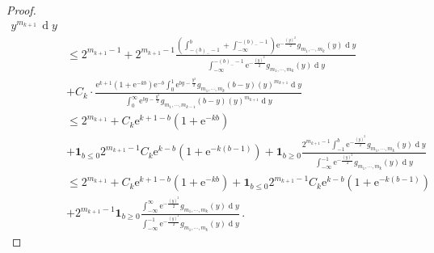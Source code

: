 \documentclass[11pt, reqno]{amsart}
\numberwithin{equation}{section}
\newcommand{\diff}{\ensuremath{\operatorname{d}\!}}
\begin{document}
\begin{proof}
\begin{align*}
{    y^{m_{k+1}} \, \diff y
}\\
&\displaystyle\le 2^{m_{k+1}-1} + 2^{m_{k+1}-1}\frac{\left(\int^b_{-(b)_- -1}+\int^{-(b)_- -1}_{-\infty}\right)\mathrm{e}^{-\frac{(y)^2}{2}} g_{m_1, \cdots, m_{k}}(y)\diff y}{\int^{-(b)_- -1}_{-\infty}\mathrm{e}^{-\frac{(y)^2}{2}} g_{m_1, \cdots, m_{k}}(y)\diff y}\\
         &\displaystyle +C_k\cdot\frac{\mathrm{e}^{k+1}(1+\mathrm{e}^{-kb}) \mathrm{e}^{-b}\int^1_{0}\mathrm{e}^{by-\frac{y^2}{2}}g_{m_1, \cdots, m_{k}}(b-y)(y)^{m_{k+1}}\diff y}{\int^\infty_{0}\mathrm{e}^{by-\frac{y^2}{2}} g_{m_1, \cdots, m_{k-1}}(b-y)(y)^{m_{k+1}}\diff y}\\
         &\displaystyle\le 2^{m_{k+1}} +C_k\mathrm{e}^{k+1-b} (1+\mathrm{e}^{-kb})\\
         &\displaystyle+\mathbf{1}_{b\le 0}2^{m_{k+1}-1}C_k\mathrm{e}^{k-b} (1+\mathrm{e}^{-k(b-1)})+\mathbf{1}_{b\ge0}\frac{2^{m_{k+1}-1}\int^b_{ -1}\mathrm{e}^{-\frac{(y)^2}{2}} g_{m_1, \cdots, m_{k}}(y)\diff y}{\int^{-1}_{-\infty}\mathrm{e}^{-\frac{(y)^2}{2}} g_{m_1, \cdots, m_{k}}(y)\diff y}\\
         &\displaystyle\le 2^{m_{k+1}} + C_k\mathrm{e}^{k+1-b} (1+\mathrm{e}^{-kb})+ \mathbf{1}_{b\le 0}2^{m_{k+1}-1}C_k\mathrm{e}^{k-b} (1+\mathrm{e}^{-k(b-1)})\\
         &+ 2^{m_{k+1}-1}\mathbf{1}_{b\ge0}\frac{\int^\infty_{ -\infty}\mathrm{e}^{-\frac{(y)^2}{2}} g_{m_1, \cdots, m_{k}}(y)\diff y}{\int^{-1}_{-\infty}\mathrm{e}^{-\frac{(y)^2}{2}} g_{m_1, \cdots, m_{k}}(y)\diff y}\,. 
\end{align*}


\end{proof}
\end{document}
